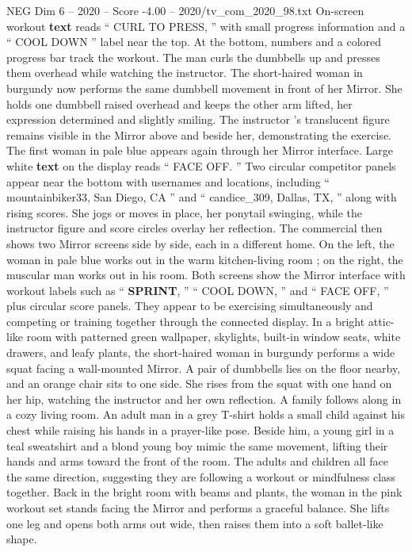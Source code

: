 \begin{textsample}{NEG Dim 6 – 2020 – Score -4.00 – 2020/tv\_com\_2020\_98.txt}
On-screen workout \textbf{text} reads “ CURL TO PRESS, ” with small progress information and a “ COOL DOWN ” label near the top.
At the bottom, numbers and a colored progress bar track the workout.
The man curls the dumbbells up and presses them overhead while watching the instructor.
The short-haired woman in burgundy now performs the same dumbbell movement in front of her Mirror.
She holds one dumbbell raised overhead and keeps the other arm lifted, her expression determined and slightly smiling.
The instructor ’s translucent figure remains visible in the Mirror above and beside her, demonstrating the exercise.
The first woman in pale blue appears again through her Mirror interface.
Large white \textbf{text} on the display reads “ FACE OFF. ” Two circular competitor panels appear near the bottom with usernames and locations, including “ mountainbiker33, San Diego, CA ” and “ candice\_309, Dallas, TX, ” along with rising scores.
She jogs or moves in place, her ponytail swinging, while the instructor figure and score circles overlay her reflection.
The commercial then shows two Mirror screens side by side, each in a different home.
On the left, the woman in pale blue works out in the warm kitchen-living room ; on the right, the muscular man works out in his room.
Both screens show the Mirror interface with workout labels such as “ \textbf{SPRINT}, ” “ COOL DOWN, ” and “ FACE OFF, ” plus circular score panels.
They appear to be exercising simultaneously and competing or training together through the connected display.
In a bright attic-like room with patterned green wallpaper, skylights, built-in window seats, white drawers, and leafy plants, the short-haired woman in burgundy performs a wide squat facing a wall-mounted Mirror.
A pair of dumbbells lies on the floor nearby, and an orange chair sits to one side.
She rises from the squat with one hand on her hip, watching the instructor and her own reflection.
A family follows along in a cozy living room.
An adult man in a grey T-shirt holds a small child against his chest while raising his hands in a prayer-like pose.
Beside him, a young girl in a teal sweatshirt and a blond young boy mimic the same movement, lifting their hands and arms toward the front of the room.
The adults and children all face the same direction, suggesting they are following a workout or mindfulness class together.
Back in the bright room with beams and plants, the woman in the pink workout set stands facing the Mirror and performs a graceful balance.
She lifts one leg and opens both arms out wide, then raises them into a soft ballet-like shape.

\end{textsample}
